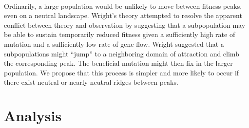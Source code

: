 \documentclass[12pt,letterpaper,titlepage,draft]{article}
\begin{document}
\paragraph{}
Ordinarily, a large population would be unlikely to move between fitness peaks,
even on a neutral landscape. Wright's theory attempted to resolve the apparent
conflict between theory and observation by suggesting that a subpopulation may
be able to sustain temporarily reduced fitness given a sufficiently high rate
of mutation and a sufficiently low rate of gene flow. Wright suggested that a
subpopulations might ``jump'' to a neighboring domain of attraction and climb
the corresponding peak. The beneficial mutation might then fix in the larger
population. We propose that this process is simpler and more likely to occur if
there exist neutral or nearly-neutral ridges between peaks.

\section{Analysis}


{}
\end{document}

